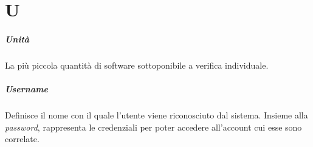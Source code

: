 \chapter{U}

\paragraph*{Unità}
La più piccola quantità di software sottoponibile a verifica individuale.

\paragraph*{Username}
Definisce il nome con il quale l'utente viene riconosciuto dal sistema. Insieme alla \textit{password}, rappresenta le credenziali per poter accedere all'account cui esse sono correlate.